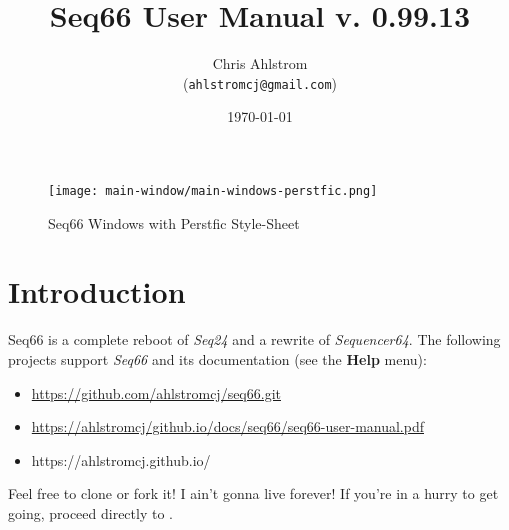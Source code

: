 \documentclass[
 11pt,
 twoside,
 a4paper,
 final                                 %
]{article}
\begin{document}
\title{Seq66 User Manual v. 0.99.13}
\author{Chris Ahlstrom \\
   (\texttt{ahlstromcj@gmail.com})}
\date{\today}
\maketitle

\begin{figure}[H]
   \centering 
   \texttt{[image: main-window/main-windows-perstfic.png]}
   \caption*{Seq66 Windows with Perstfic Style-Sheet}
\end{figure}

\clearpage                             %

\tableofcontents
\listoffigures                         %
\listoftables                          %

%

\parindent 0pt
\parskip 9pt

\rhead{\rightmark}         %

\section{Introduction}
\label{sec:introduction}

   Seq66 is a complete reboot of \textsl{Seq24} and a rewrite of
   \textsl{Sequencer64}.
   The following projects support \textsl{Seq66} and its documentation (see
   the \textbf{Help} menu):

   \begin{itemize}
      \item \url{https://github.com/ahlstromcj/seq66.git}
      \item \url{https://ahlstromcj/github.io/docs/seq66/seq66-user-manual.pdf}
      \item https://ahlstromcj.github.io/
   \end{itemize}

   Feel free to clone or fork it!
   I ain't gonna live forever!
   If you're in a hurry to get going, proceed directly to
   .
\end{document}
